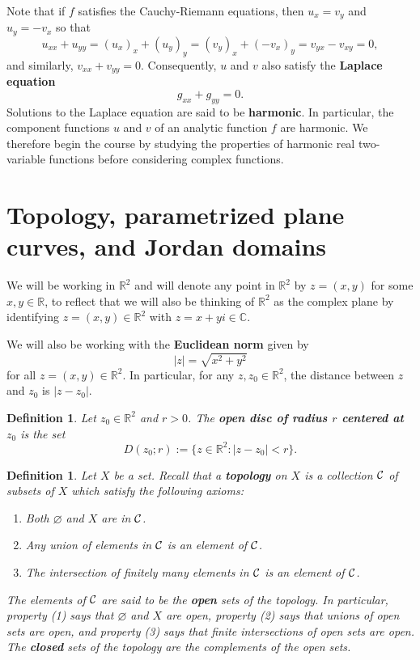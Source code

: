 \documentclass[10pt]{article}
\newcommand{\R}{\mathbb{R}}
\newcommand{\C}{\mathbb{C}}
\theoremstyle{newstyle}
\newtheorem{defn}[thm]{Definition}
\begin{document}
Note that if $f$ satisfies the Cauchy-Riemann equations, then $u_x = v_y$ and 
$u_y = -v_x$ so that 
\[ u_{xx} + u_{yy} = (u_x)_x + (u_y)_y = (v_y)_x + (-v_x)_y = v_{yx} - v_{xy} = 0, \]
and similarly, $v_{xx} + v_{yy} = 0$. Consequently, $u$ and $v$ also satisfy the 
{\bf Laplace equation} 
\[ g_{xx} + g_{yy} = 0. \]
Solutions to the Laplace equation are said to be {\bf harmonic}. In particular, 
the component functions $u$ and $v$ of an analytic function $f$ are harmonic. 
We therefore begin the course by studying the properties of harmonic real 
two-variable functions before considering complex functions.

\newpage 
\section{Topology, parametrized plane curves, and Jordan domains}

We will be working in $\R^2$ and will denote any point in $\R^2$ by $z = (x, y)$ for some 
$x, y \in \R$, to reflect that we will also be thinking of $\R^2$ as the complex plane by 
identifying $z = (x, y) \in \R^2$ with $z = x+yi \in \C$. 

We will also be working with the {\bf Euclidean norm} given by 
\[ |z| = \sqrt{x^2 + y^2} \]
for all $z = (x, y) \in \R^2$. In particular, for any $z, z_0 \in \R^2$, the distance 
between $z$ and $z_0$ is $|z - z_0|$. 

\begin{defn}
Let $z_0 \in \R^2$ and $r > 0$. The {\bf open disc of radius $r$ centered at $z_0$} is the set 
\[ D(z_0; r) := \{z \in \R^2 : |z - z_0| < r\}. \]
\end{defn}

\begin{defn} 
Let $X$ be a set. Recall that a {\bf topology} on $X$ is a collection ${\cal C}$ of subsets of $X$ 
which satisfy the following axioms:
\begin{enumerate}[(1)]
    \item Both $\varnothing$ and $X$ are in ${\cal C}$.
    \item Any union of elements in ${\cal C}$ is an element of ${\cal C}$.
    \item The intersection of {\it finitely many} elements in ${\cal C}$ is an element of ${\cal C}$.
\end{enumerate}
The elements of ${\cal C}$ are said to be the {\bf open} sets of the topology. 
In particular, property (1) says that $\varnothing$ and $X$ are open, property (2) says that 
unions of open sets are open, and property (3) says that {\it finite} intersections of 
open sets are open. The 
{\bf closed} sets of the topology are the complements of the open sets.
\end{defn}
\end{document}
